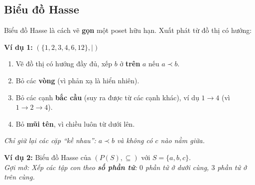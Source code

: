 \documentclass[12pt,a4paper]{article}
\begin{document}
\subsection{Biểu đồ Hasse}

Biểu đồ Hasse là cách vẽ \textbf{gọn} một poset hữu hạn. Xuất phát từ đồ thị có hướng:

\noindent
\begin{minipage}[c]{0.58\textwidth}
\textbf{Ví dụ 1:} $(\{1, 2, 3, 4, 6, 12\}, \mid)$
\begin{enumerate}
  \item Vẽ đồ thị có hướng đầy đủ, xếp $b$ ở \textbf{trên} $a$ nếu $a \prec b$.
  \item Bỏ các \textbf{vòng} (vì phản xạ là hiển nhiên).
  \item Bỏ các cạnh \textbf{bắc cầu} (suy ra được từ các cạnh khác), ví dụ $1 \to 4$ (vì $1 \to 2 \to 4$).
  \item Bỏ \textbf{mũi tên}, vì chiều luôn từ dưới lên.
\end{enumerate}
\textit{Chỉ giữ lại các cặp ``kề nhau'': $a \prec b$ và không có $c$ nào nằm giữa.}
\end{minipage}
\hfill
\begin{minipage}[c]{0.38\textwidth}
\centering
{}
\end{minipage}

\vspace{8pt}
\textbf{Ví dụ 2:} Biểu đồ Hasse của $(P(S), \subseteq)$ với $S = \{a, b, c\}$.\\
\textit{Gợi mở: Xếp các tập con theo \textbf{số phần tử}: $0$ phần tử ở dưới cùng, $3$ phần tử ở trên cùng.}
\end{document}
